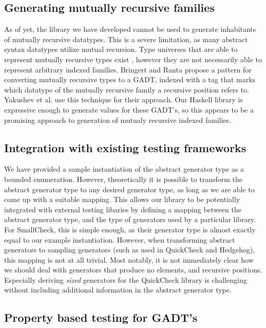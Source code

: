 \documentclass[a4paper,msc,twosized=semi]{uustthesis}
\begin{document}
\subsection{Generating mutually recursive families}

  As of yet, the library we have developed cannot be used to generate inhabitants of mutually recursive datatypes. This is a severe limitation, as many abstract syntax datatypes utilize mutual recursion. Type universes that are able to represent mutually recursive types exist \cite{miraldo2018sums , yakushev2009generic}, however they are not necessarily able to represent arbitrary indexed families. Bringert and Ranta \cite{bringert2006pattern} propose a pattern for converting mutually recursive types to a GADT, indexed with a tag that marks which datatype of the mutually recursive family a recursive position refers to. Yakushev et al. \cite{yakushev2009generic} use this technique for their approach. Our Haskell library is expressive enough to generate values for these GADT's, so this appears to be a promising approach to generation of mutualy recursive indexed families. 

\subsection{Integration with existing testing frameworks}

  We have provided a sample instantiation of the abstract generator type as a bounded enumeration. However, theoretically it is possible to transform the abstract generator type to any desired generator type, as long as we are able to come up with a suitable mapping. This allows our library to be potentially integrated with external testing libaries by defining a mapping between the abstract generator type, and the type of generators used by a particular library. For SmallCheck, this is simple enough, as their generator type is almost exactly equal to our example instantiation. However, when transforming abstract generators to sampling generators (such as used in QuickCheck and Hedgehog), this mapping is not at all trivial. Most notably, it is not immediately clear how we should deal with generators that produce no elements, and recursive positions. Especially deriving \emph{sized} generators for the QuickCheck library is challenging without including additional information in the abstract generator type. 

\subsection{Property based testing for GADT's}
\end{document}
